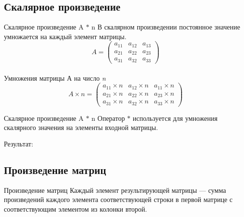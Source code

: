 \documentclass[12pt]{beamer}
\begin{document}
\subsection{Скалярное произведение}
\begin{frame}{Скалярное произведение A $*$ n}
В скалярном произведении постоянное значение умножается на каждый элемент матрицы.\\
\[
  A = 
  \begin{pmatrix}
    a_{11} & a_{12} & a_{13}\\
    a_{21} & a_{22} & a_{23}\\
    a_{31} & a_{32} & a_{33}
  \end{pmatrix}
\]
\\
Умножения матрицы А на число \emph{n}
\\
\[
  A \times n = 
  \begin{pmatrix}
    a_{11} \times n & a_{12} \times n & a_{11} \times n \\
    a_{21} \times n & a_{22} \times n & a_{23} \times n \\
    a_{31} \times n & a_{32} \times n & a_{33} \times n
  \end{pmatrix}
\]
\end{frame}


\begin{frame}{Скалярное произведение  A $*$ n}
Оператор $*$ используется для умножения скалярного значения на элементы входной матрицы.
\vspace{0.2cm}

Результат: \\

\end{frame}




\subsection{Произведение матриц}
\begin{frame}{Произведение матриц}
Каждый элемент результирующей матрицы — сумма произведений каждого элемента соответствующей строки в первой матрице с соответствующим элементом из колонки второй. 
\vspace{0.2cm}
 \\
\end{frame}
\end{document}
